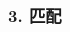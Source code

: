 \documentclass{beamer}
\theoremstyle{definition}
\theoremstyle{example}
\begin{document}
\begin{CJK}{UTF8}{gbsn}
\begin{frame}
\end{frame}








\begin{frame}
  \frametitle{3. 匹配}


\end{frame}
\end{CJK}
\end{document}
